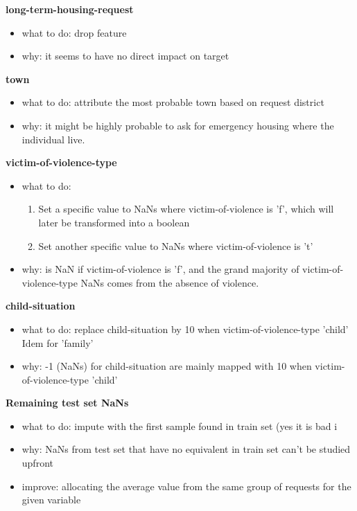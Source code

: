 \documentclass[11pt]{article}
\theoremstyle{definition}
\begin{document}
            \textbf{long-term-housing-request}
            \begin{itemize}
                \item what to do: drop feature
                \item why: it seems to have no direct impact on target
            \end{itemize}            

            \textbf{town}
            \begin{itemize}
                \item what to do: attribute the most probable town based on request district
                \item why: it might be highly probable to ask for emergency housing where the individual live.
            \end{itemize}            
            

            \textbf{victim-of-violence-type}
            \begin{itemize}
                \item what to do:
                \begin{enumerate}
                    \item Set a specific value to NaNs where victim-of-violence is 'f', which will later be transformed into a boolean
                    \item Set another specific value to NaNs where victim-of-violence is 't'
                \end{enumerate}
                \item why: is NaN if victim-of-violence is 'f', and the grand majority of victim-of-violence-type NaNs comes from the absence of violence.
            \end{itemize}
            

            \textbf{child-situation}
            \begin{itemize}
                \item what to do: replace child-situation by 10 when victim-of-violence-type 'child' Idem for 'family'
                \item why: -1 (NaNs) for child-situation are mainly mapped with 10 when victim-of-violence-type 'child'
            \end{itemize}
            
            \textbf{Remaining test set NaNs}
            \begin{itemize}
                \item what to do: impute with the first sample found in train set (yes it is bad ^^)
                \item why: NaNs from test set that have no equivalent in train set can't be studied upfront
                \item improve: allocating the average value from the same group of requests for the given variable
            \end{itemize}
        
\end{document}
